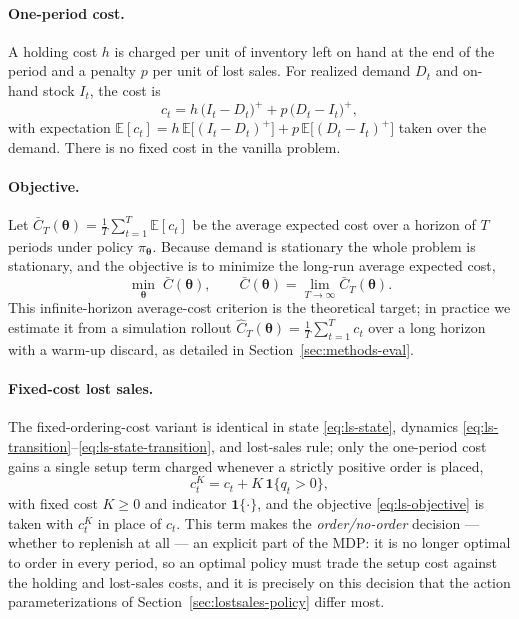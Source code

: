\documentclass[11pt]{article}
\newcommand{\btheta}{\boldsymbol{\theta}}
\begin{document}
\paragraph{One-period cost.}
A holding cost $h$ is charged per unit of inventory left on hand at the end of the period and a
penalty $p$ per unit of lost sales. For realized demand $D_t$ and on-hand stock $I_t$, the cost is
\begin{equation}
    c_t = h\,\bigl(I_t-D_t\bigr)^{+} + p\,\bigl(D_t-I_t\bigr)^{+},
    \label{eq:ls-cost}
\end{equation}
with expectation $\mathbb{E}[c_t]=h\,\mathbb{E}\bigl[(I_t-D_t)^{+}\bigr]+p\,\mathbb{E}\bigl[(D_t-I_t)^{+}\bigr]$
taken over the demand. There is no fixed cost in the vanilla problem.

\paragraph{Objective.}
Let $\bar C_T(\btheta)=\frac{1}{T}\sum_{t=1}^{T}\mathbb{E}[c_t]$ be the average expected cost over a
horizon of $T$ periods under policy $\pi_{\btheta}$. Because demand is stationary the whole problem is
stationary, and the objective is to minimize the long-run average expected cost,
\begin{equation}
    \min_{\btheta}\;\bar C(\btheta), \qquad
    \bar C(\btheta) = \lim_{T\to\infty} \bar C_T(\btheta).
    \label{eq:ls-objective}
\end{equation}
This infinite-horizon average-cost criterion is the theoretical target; in practice we estimate it
from a simulation rollout $\hat C_T(\btheta)=\frac{1}{T}\sum_{t=1}^{T}c_t$ over a long horizon with a
warm-up discard, as detailed in Section~\ref{sec:methods-eval}.

\paragraph{Fixed-cost lost sales.}
The fixed-ordering-cost variant is identical in state \eqref{eq:ls-state}, dynamics
\eqref{eq:ls-transition}--\eqref{eq:ls-state-transition}, and lost-sales rule; only the one-period
cost gains a single setup term charged whenever a strictly positive order is placed,
\begin{equation}
    c_t^{K} = c_t + K\,\mathbf{1}\{q_t>0\},
    \label{eq:ls-fixed-cost}
\end{equation}
with fixed cost $K\ge0$ and indicator $\mathbf{1}\{\cdot\}$, and the objective
\eqref{eq:ls-objective} is taken with $c_t^{K}$ in place of $c_t$. This term makes the
\emph{order/no-order} decision --- whether to replenish at all --- an explicit part of the MDP: it is
no longer optimal to order in every period, so an optimal policy must trade the setup cost against the
holding and lost-sales costs, and it is precisely on this decision that the action parameterizations
of Section~\ref{sec:lostsales-policy} differ most.
\end{document}
